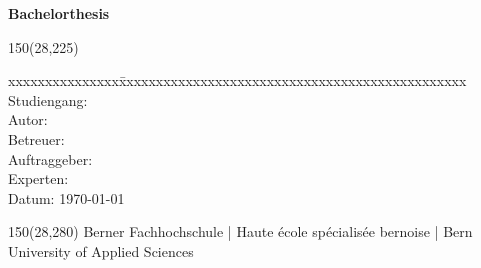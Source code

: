 \begin{titlepage}
\begin{flushleft}
\fontsize{10pt}{12pt}\selectfont
\textbf{Bachelorthesis} \\		%
\vspace{3mm}


\begin{textblock}{150}(28,225)
\fontsize{10pt}{17pt}\selectfont
\begin{tabbing}
	xxxxxxxxxxxxxxx\=xxxxxxxxxxxxxxxxxxxxxxxxxxxxxxxxxxxxxxxxxxxxxxx \kill
	Studiengang:	\> \studiengang		\\
	Autor:		\> \autor		\\
	Betreuer:	\> \betreuer		\\
	Auftraggeber:	\> \auftraggeber	\\
	Experten:	\> \experte		\\
	Datum:		\> \today		\\
\end{tabbing}

\end{textblock}
\end{flushleft}

\begin{textblock}{150}(28,280)
\noindent 
\color{bfhgrey}\fontsize{9pt}{10pt}\selectfont
Berner Fachhochschule | Haute école spécialisée bernoise | Bern University of Applied Sciences
\color{black}\selectfont
\end{textblock}


\end{titlepage}
